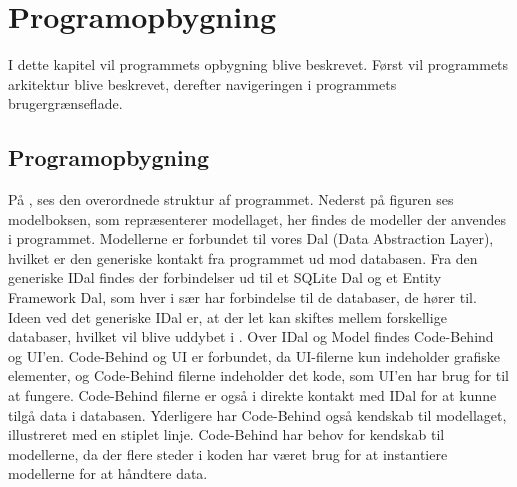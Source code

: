 \chapter{Programopbygning}

I dette kapitel vil programmets opbygning blive beskrevet. 
Først vil programmets arkitektur blive beskrevet, derefter navigeringen i programmets brugergrænseflade. 


\section{Programopbygning}\label{sec:programopbygning}



På , ses den overordnede struktur af programmet.
Nederst på figuren ses modelboksen, som repræsenterer modellaget, her findes de modeller der anvendes i programmet.
Modellerne er forbundet til vores Dal (Data Abstraction Layer), hvilket er den generiske kontakt fra programmet ud mod databasen. 	
Fra den generiske IDal findes der forbindelser ud til et SQLite Dal og et Entity Framework Dal, som hver i sær har forbindelse til de databaser, de hører til. 
Ideen ved det generiske IDal er, at der let kan skiftes mellem forskellige databaser, hvilket vil blive uddybet i .
Over IDal og Model findes Code-Behind og UI'en. 
Code-Behind og UI er forbundet, da UI-filerne kun indeholder grafiske elementer, og Code-Behind filerne indeholder det kode, som UI'en har brug for til at fungere.
Code-Behind filerne er også i direkte kontakt med IDal  for at kunne tilgå data i databasen.
Yderligere har Code-Behind også kendskab til modellaget, illustreret med en stiplet linje.
Code-Behind har behov for kendskab til modellerne, da der flere steder i koden har været brug for at instantiere modellerne for at håndtere data. 

